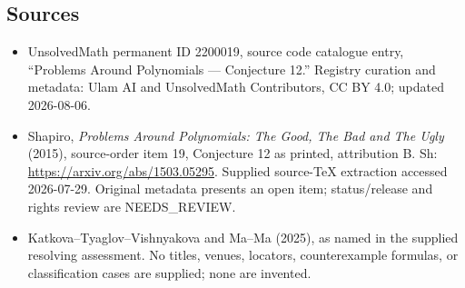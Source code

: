 \documentclass[11pt]{article}
\begin{document}
\subsection{Sources}
\begin{itemize}
\item UnsolvedMath permanent ID 2200019, source code catalogue entry, ``Problems Around Polynomials --- Conjecture 12.'' Registry curation and metadata: Ulam AI and UnsolvedMath Contributors, CC BY 4.0; updated 2026-08-06.
\item Shapiro, \emph{Problems Around Polynomials: The Good, The Bad and The Ugly} (2015), source-order item 19, Conjecture 12 as printed, attribution B. Sh: \url{https://arxiv.org/abs/1503.05295}. Supplied source-TeX extraction accessed 2026-07-29. Original metadata presents an open item; status/release and rights review are NEEDS\_REVIEW.
\item Katkova--Tyaglov--Vishnyakova and Ma--Ma (2025), as named in the supplied resolving assessment. No titles, venues, locators, counterexample formulas, or classification cases are supplied; none are invented.
\end{itemize}
\end{document}
